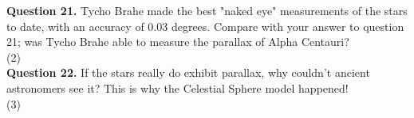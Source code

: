 \documentclass[11pt]{article}
\begin{document}
\textbf{Question 21.} Tycho Brahe made the best "naked eye" measurements of the stars to date, with an accuracy of 0.03 degrees. Compare with your answer to question 21; was Tycho Brahe able to measure the parallax of Alpha Centauri?\\

\vspace{1.5cm}
(2) \hrulefill\\

\textbf{Question 22.} If the stars really do exhibit parallax, why couldn't ancient astronomers see it? This is why the Celestial Sphere model happened!\\

\vspace{1.5cm}
(3) \hrulefill\\
\end{document}
